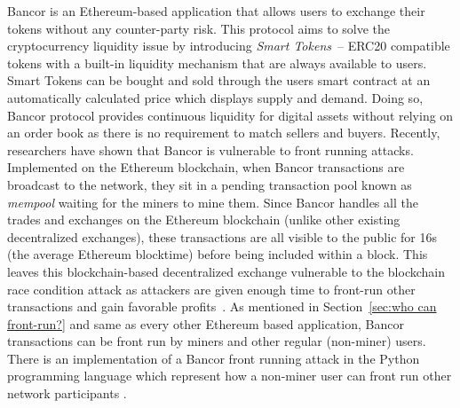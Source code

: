 Bancor is an Ethereum-based application that allows users to exchange their tokens without any counter-party risk. This protocol aims to solve the cryptocurrency liquidity issue by introducing \textit{Smart Tokens}~\cite{hertzog2017bancor}-- ERC20 compatible tokens with a built-in liquidity mechanism that are always available to users. Smart Tokens can be bought and sold through the users smart contract at an automatically calculated price which displays supply and demand. Doing so, Bancor protocol provides continuous liquidity for digital assets without relying on an order book as there is no requirement to match sellers and buyers.
Recently, researchers have shown that Bancor is vulnerable to front running attacks. Implemented on the Ethereum blockchain, when Bancor transactions are broadcast to the network, they sit in a pending transaction pool known as \textit{mempool} waiting for the miners to mine them. Since Bancor handles all the trades and exchanges on the Ethereum blockchain (unlike other existing decentralized exchanges), these transactions are all visible to the public for 16s (the average Ethereum blocktime) before being included within a block. This leaves this blockchain-based decentralized exchange vulnerable to the blockchain race condition attack as attackers are given enough time to front-run other transactions and gain favorable profits~\cite{BancorIs7:online}. As mentioned in Section~\ref{sec:who can front-run?} and same as every other Ethereum based application, Bancor transactions can be front run by miners and other regular (non-miner) users. There is an implementation of a Bancor front running attack in the Python programming language which represent how a non-miner user can front run other network participants \cite{NewTab13:online}.

